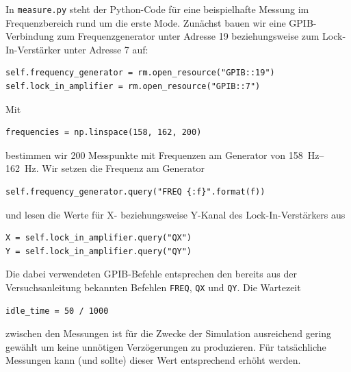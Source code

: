 In \texttt{measure.py} steht der Python-Code für eine beispielhafte Messung im Frequenzbereich rund um die erste Mode.
Zunächst bauen wir eine GPIB-Verbindung zum Frequenzgenerator unter Adresse 19 beziehungsweise zum Lock-In-Verstärker unter Adresse 7 auf:
\begin{small}
\begin{lstlisting}[xleftmargin=10mm,numbers=none]
self.frequency_generator = rm.open_resource("GPIB::19")
self.lock_in_amplifier = rm.open_resource("GPIB::7")
\end{lstlisting}
\end{small}

Mit
\begin{small}
\begin{lstlisting}[xleftmargin=10mm,numbers=none]
frequencies = np.linspace(158, 162, 200)
\end{lstlisting}
\end{small}

bestimmen wir 200 Messpunkte mit Frequenzen am Generator von \SIrange{158}{162}{\hertz}. Wir setzen die Frequenz am Generator
\begin{small}
\begin{lstlisting}[xleftmargin=10mm,numbers=none]
self.frequency_generator.query("FREQ {:f}".format(f))
\end{lstlisting}
\end{small}

und lesen die Werte für X- beziehungsweise Y-Kanal des Lock-In-Verstärkers aus
\begin{small}
\begin{lstlisting}[xleftmargin=10mm,numbers=none]
X = self.lock_in_amplifier.query("QX")
Y = self.lock_in_amplifier.query("QY")
\end{lstlisting}
\end{small}

Die dabei verwendeten GPIB-Befehle entsprechen den bereits aus der Versuchsanleitung \cite{Anleitung} bekannten Befehlen \texttt{FREQ}, \texttt{QX} und \texttt{QY}.
Die Wartezeit
\begin{small}
\begin{lstlisting}[xleftmargin=10mm,numbers=none]
idle_time = 50 / 1000
\end{lstlisting}
\end{small}

zwischen den Messungen ist für die Zwecke der Simulation ausreichend gering gewählt um keine unnötigen Verzögerungen zu produzieren.
Für tatsächliche Messungen kann (und sollte) dieser Wert entsprechend erhöht werden.

